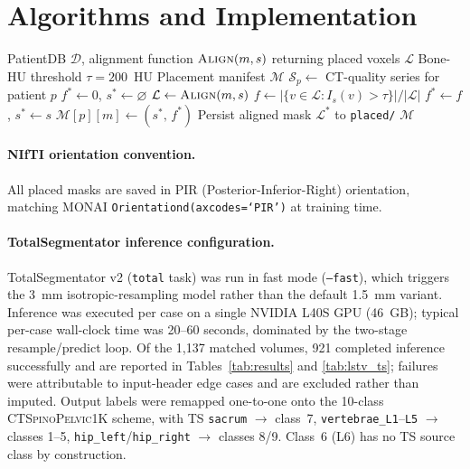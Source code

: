 \documentclass[pmlr]{jmlr}
\newcommand{\dataset}{\textsc{CTSpinoPelvic1K}}
\begin{document}
\section{Algorithms and Implementation}
\label{app:algorithm}

\begin{algorithm}[h]
\caption{Phase~2: Intrapatient Exhaustive Series Assignment}
\label{alg:phase2}
\begin{algorithmic}[1]
\REQUIRE PatientDB $\mathcal{D}$, alignment function
  $\textsc{Align}(m, s)$ returning placed voxels $\mathcal{L}$
\REQUIRE Bone-HU threshold $\tau = 200$~HU
\ENSURE Placement manifest $\mathcal{M}$
  \STATE $\mathcal{S}_p \leftarrow$ CT-quality series for patient $p$
    \STATE $f^* \leftarrow 0$, $s^* \leftarrow \varnothing$
      \STATE $\mathcal{L} \leftarrow \textsc{Align}(m, s)$
      \STATE $f \leftarrow
        |\{v \in \mathcal{L} : I_s(v) > \tau\}| / |\mathcal{L}|$
        \STATE $f^* \leftarrow f$,\; $s^* \leftarrow s$
      \ENDIF
    \ENDFOR
    \STATE $\mathcal{M}[p][m] \leftarrow (s^*,\, f^*)$
    \STATE Persist aligned mask $\mathcal{L}^*$ to \texttt{placed/}
  \ENDFOR
\ENDFOR
\RETURN $\mathcal{M}$
\end{algorithmic}
\end{algorithm}

\paragraph{NIfTI orientation convention.}
All placed masks are saved in PIR (Posterior-Inferior-Right)
orientation, matching MONAI \texttt{Orientationd(axcodes=`PIR')}
at training time.

\paragraph{TotalSegmentator inference configuration.}
TotalSegmentator v2 (\texttt{total} task) was run in fast mode
(\texttt{--fast}), which triggers the 3~mm isotropic-resampling
model rather than the default 1.5~mm variant.
Inference was executed per case on a single NVIDIA L40S GPU
(46~GB); typical per-case wall-clock time was 20--60 seconds,
dominated by the two-stage resample/predict loop.
Of the 1{,}137 matched volumes, 921 completed inference
successfully and are reported in Tables~\ref{tab:results} and
\ref{tab:lstv_ts}; failures were attributable to input-header
edge cases and are excluded rather than imputed.
Output labels were remapped one-to-one onto the 10-class
\dataset{} scheme, with TS \texttt{sacrum} $\rightarrow$ class~7,
\texttt{vertebrae\_L1}--\texttt{L5} $\rightarrow$ classes 1--5,
\texttt{hip\_left}/\texttt{hip\_right} $\rightarrow$ classes 8/9.
Class~6 (L6) has no TS source class by construction.
\end{document}
